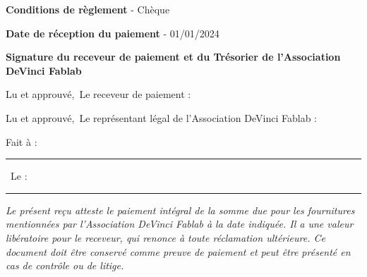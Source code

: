 \documentclass[11pt,a4paper]{article}
\begin{document}
\vspace{0.5cm}

\textbf{Conditions de règlement} - Chèque

\vspace{0.2cm}

\textbf{Date de réception du paiement} - 01/01/2024

\vspace{\fill}
\begin{framed}
    \begin{center}
        \textbf{Signature du receveur de paiement et du Trésorier de l'Association DeVinci Fablab}
    \end{center}

    \vspace{0.2cm}

    \begin{minipage}[t]{0.45\textwidth}
        \begin{flushleft}
            Lu et approuvé,\
            Le receveur de paiement :\
            \vspace{1.5cm}
        \end{flushleft}
    \end{minipage}\hfill
    \vrule width 0.75pt\hfill
    \begin{minipage}[t]{0.45\textwidth}
        \begin{flushright}
            Lu et approuvé,\
            Le représentant légal de l'Association DeVinci Fablab :\
            \vspace{1.5cm}
        \end{flushright}
    \end{minipage}

    \vspace{0.5cm}
    \begin{center}
        Fait à : \rule{3cm}{0.75pt} \
        Le : \rule{3cm}{0.75pt}
    \end{center}
\end{framed}



\vspace{0.5cm}
\textit{\footnotesize Le présent reçu atteste le paiement intégral de la somme due pour les fournitures mentionnées par l'Association DeVinci Fablab à la date indiquée. Il a une valeur libératoire pour le receveur, qui renonce à toute réclamation ultérieure. Ce document doit être conservé comme preuve de paiement et peut être présenté en cas de contrôle ou de litige. }
\end{document}
